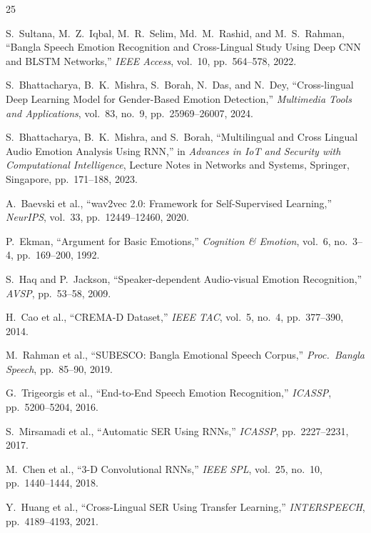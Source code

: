 \documentclass[conference]{IEEEtran}
\begin{document}
\begin{thebibliography}{25}

S.~Sultana, M.~Z.~Iqbal, M.~R.~Selim, Md.~M.~Rashid, and M.~S.~Rahman,
``Bangla Speech Emotion Recognition and Cross-Lingual Study Using Deep CNN and BLSTM Networks,''
\textit{IEEE Access}, vol.~10, pp.~564--578, 2022.

S.~Bhattacharya, B.~K.~Mishra, S.~Borah, N.~Das, and N.~Dey,
``Cross-lingual Deep Learning Model for Gender-Based Emotion Detection,''
\textit{Multimedia Tools and Applications}, vol.~83, no.~9, pp.~25969--26007, 2024.

S.~Bhattacharya, B.~K.~Mishra, and S.~Borah,
``Multilingual and Cross Lingual Audio Emotion Analysis Using RNN,''
in \textit{Advances in IoT and Security with Computational Intelligence},
Lecture Notes in Networks and Systems, Springer, Singapore,
pp.~171--188, 2023.

A.~Baevski et al.,
``wav2vec 2.0: Framework for Self-Supervised Learning,''
\textit{NeurIPS}, vol.~33, pp.~12449--12460, 2020.

P.~Ekman,
``Argument for Basic Emotions,''
\textit{Cognition \& Emotion}, vol.~6, no.~3--4, pp.~169--200, 1992.

S.~Haq and P.~Jackson,
``Speaker-dependent Audio-visual Emotion Recognition,''
\textit{AVSP}, pp.~53--58, 2009.

H.~Cao et al.,
``CREMA-D Dataset,''
\textit{IEEE TAC}, vol.~5, no.~4, pp.~377--390, 2014.

M.~Rahman et al.,
``SUBESCO: Bangla Emotional Speech Corpus,''
\textit{Proc.\ Bangla Speech}, pp.~85--90, 2019.

G.~Trigeorgis et al.,
``End-to-End Speech Emotion Recognition,''
\textit{ICASSP}, pp.~5200--5204, 2016.

S.~Mirsamadi et al.,
``Automatic SER Using RNNs,''
\textit{ICASSP}, pp.~2227--2231, 2017.

M.~Chen et al.,
``3-D Convolutional RNNs,''
\textit{IEEE SPL}, vol.~25, no.~10, pp.~1440--1444, 2018.

Y.~Huang et al.,
``Cross-Lingual SER Using Transfer Learning,''
\textit{INTERSPEECH}, pp.~4189--4193, 2021.


\end{thebibliography}
\end{document}
